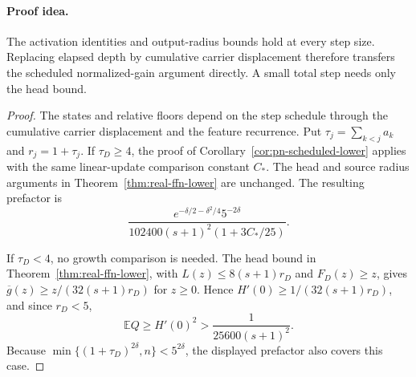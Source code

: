 \paragraph{Proof idea.}
The activation identities and output-radius bounds hold at every
step size. Replacing elapsed depth by cumulative carrier displacement
therefore transfers the scheduled normalized-gain argument directly.
A small total step needs only the head bound.

\begin{proof}
The states and relative floors depend on the step schedule through
the cumulative carrier displacement and the feature recurrence.
Put $\tau_j=\sum_{k<j}a_k$ and $r_j=1+\tau_j$. If $\tau_D\ge4$, the
proof of Corollary~\ref{cor:pn-scheduled-lower} applies with the
same linear-update comparison constant $C_*$. The head and source
radius arguments in Theorem~\ref{thm:real-ffn-lower} are unchanged.
The resulting prefactor is
\[
 \frac{e^{-\delta/2-\delta^2/4}5^{-2\delta}}
 {102400(s+1)^2(1+3C_*/25)}.
\]

If $\tau_D<4$, no growth comparison is needed. The head bound in
Theorem~\ref{thm:real-ffn-lower}, with $L(z)\le8(s+1)r_D$ and
$F_D(z)\ge z$, gives $\overline g(z)\ge z/(32(s+1)r_D)$ for $z\ge0$.
Hence $H'(0)\ge1/(32(s+1)r_D)$, and since $r_D<5$,
\[
 \mathbb EQ\ge H'(0)^2>\frac1{25600(s+1)^2}.
\]
Because $\min\{(1+\tau_D)^{2\delta},n\}<5^{2\delta}$, the displayed
prefactor also covers this case.
\end{proof}

